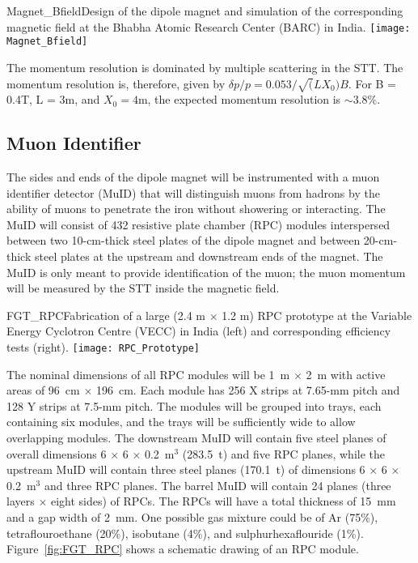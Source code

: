 \begin{cdrfigure}{Magnet_Bfield}{Design of the dipole magnet and simulation of the 
corresponding magnetic field at the Bhabha Atomic Research Center (BARC) in India.}  
\texttt{[image: Magnet\_Bfield]} %
\end{cdrfigure}

The momentum resolution is dominated by multiple scattering in the STT. The momentum resolution is, therefore, given by 
$\delta p/p = 0.053/\sqrt(LX_0)B$. For B = 0.4T, L = 3m, and $X_0 = 4$m, the
expected momentum resolution is $\sim 3.8\%$. 

\subsection{Muon Identifier}
\label{cdrsec:detectors-nd-ref-fgt-muonid}

The sides and ends of the dipole magnet will be instrumented
with a muon identifier
detector (MuID) that will distinguish muons from hadrons by the ability 
of muons to penetrate the iron without showering or interacting.
The MuID will consist of 432 resistive plate chamber (RPC) modules
interspersed between two 10-cm-thick steel plates of the 
dipole magnet and between 20-cm-thick steel plates at the upstream and
downstream ends of the magnet. 
The MuID is only meant to provide %
identification of the 
muon; the muon momentum %
will be measured by the STT inside the 
magnetic field.

\begin{cdrfigure}{FGT_RPC}{Fabrication of a large (2.4 m $\times$ 1.2 m) RPC prototype at 
the Variable Energy Cyclotron Centre (VECC) in India (left) and corresponding efficiency tests (right).}
\texttt{[image: RPC\_Prototype]} %
\end{cdrfigure}

The nominal dimensions of all RPC modules will be 1~m $\times$ 2~m with
active areas of 96~cm $\times$ 196~cm. Each
module has 256 X strips
at 7.65-mm pitch and 128 Y strips at 7.5-mm pitch. The modules
will be grouped into trays, each containing six modules, and the trays will
be sufficiently wide to allow overlapping modules. 
The downstream MuID will contain five steel planes of 
overall dimensions
6 $\times$ 6 $\times$ 0.2~m$^3$ (283.5~t)
and five RPC planes, while the upstream MuID will contain three steel
planes (170.1~t) of dimensions 6 $\times$ 6 $\times$ 0.2~m$^3$ and three RPC planes. The barrel MuID will contain
24 planes (three layers $\times$ eight sides) of RPCs. The RPCs will have a total thickness 
of 15~mm and a gap width of 2~mm. One possible gas mixture could be %
of Ar (75\%), tetraflouroethane (20\%), isobutane (4\%),
and sulphurhexaflouride (1\%). 
Figure~\ref{fig:FGT_RPC} shows a schematic drawing of an RPC module. 



